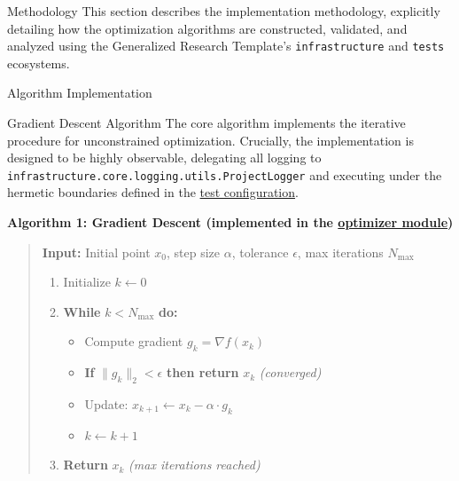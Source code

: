 \documentclass[
  ignorenonframetext,
]{beamer}
\author{\texorpdfstring{}{}}
\date{}
\providecommand{\tightlist}{%
  \setlength{\itemsep}{0pt}\setlength{\parskip}{0pt}}
\begin{document}
\begin{frame}[fragile]{Methodology}
\protect{}\label{methodology}
This section describes the implementation methodology, explicitly
detailing how the optimization algorithms are constructed, validated,
and analyzed using the Generalized Research Template's
\texttt{infrastructure} and \texttt{tests} ecosystems.

\begin{block}{Algorithm Implementation}
\protect{}\label{algorithm-implementation}
\begin{block}{Gradient Descent Algorithm}
\protect{}\label{gradient-descent-algorithm}
The core algorithm implements the iterative procedure for unconstrained
optimization. Crucially, the implementation is designed to be highly
observable, delegating all logging to
\texttt{infrastructure.core.logging.utils.ProjectLogger} and executing
under the hermetic boundaries defined in the
\href{https://github.com/docxology/template/blob/main/projects/code_project/tests/conftest.py}{test
configuration}.

\textbf{Algorithm 1: Gradient Descent (implemented in the
\href{https://github.com/docxology/template/blob/main/projects/code_project/src/optimizer.py\#L42-L138}{optimizer
module})}

\begin{quote}
\textbf{Input:} Initial point \(x_0\), step size \(\alpha\), tolerance
\(\epsilon\), max iterations \(N_{\max}\)

\begin{enumerate}
\tightlist
\item
  Initialize \(k \leftarrow 0\)
\item
  \textbf{While} \(k < N_{\max}\) \textbf{do:}

  \begin{itemize}
  \tightlist
  \item
    Compute gradient \(g_k = \nabla f(x_k)\)
  \item
    \textbf{If} \(\|g_k\|_2 < \epsilon\) \textbf{then return} \(x_k\)
    \emph{(converged)}
  \item
    Update: \(x_{k+1} \leftarrow x_k - \alpha \cdot g_k\)
  \item
    \(k \leftarrow k + 1\)
  \end{itemize}
\item
  \textbf{Return} \(x_k\) \emph{(max iterations reached)}
\end{enumerate}
\end{quote}
\end{block}
\end{block}


\end{frame}
\end{document}
